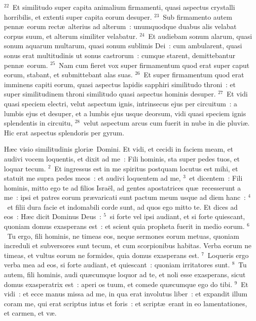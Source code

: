 ${}^{22}$~Et similitudo super capita animalium firmamenti, quasi aspectus crystalli horribilis, et extenti super capita eorum desuper.
${}^{23}$~Sub firmamento autem penn\ae\ eorum rect\ae\ alterius ad alterum~: unumquodque duabus alis velabat corpus suum, et alterum similiter velabatur.
${}^{24}$~Et audiebam sonum alarum, quasi sonum aquarum multarum, quasi sonum sublimis Dei~: cum ambularent, quasi sonus erat multitudinis ut sonus castrorum~: cumque starent, demittebantur penn\ae\ eorum.
${}^{25}$~Nam cum fieret vox super firmamentum quod erat super caput eorum, stabant, et submittebant alas suas.
${}^{26}$~Et super firmamentum quod erat imminens capiti eorum, quasi aspectus lapidis sapphiri similitudo throni~: et super similitudinem throni similitudo quasi aspectus hominis desuper.
${}^{27}$~Et vidi quasi speciem electri, velut aspectum ignis, intrinsecus ejus per circuitum~: a lumbis ejus et desuper, et a lumbis ejus usque deorsum, vidi quasi speciem ignis splendentis in circuitu,
${}^{28}$~velut aspectum arcus cum fuerit in nube in die pluvi\ae . Hic erat aspectus splendoris per gyrum.

\lettrine[lines=10,image=true,loversize=0.05,lraise=-0.03]{H}{}\ae c visio similitudinis glori\ae\ Domini. Et vidi, et cecidi in faciem meam, et audivi vocem loquentis, et dixit ad me~: Fili hominis, sta super pedes tuos, et loquar tecum.
${}^{2}$~Et ingressus est in me spiritus postquam locutus est mihi, et statuit me supra pedes meos~: et audivi loquentem ad me,
${}^{3}$~et dicentem~: Fili hominis, mitto ego te ad filios Isra\"el, ad gentes apostatrices qu\ae\ recesserunt a me~: ipsi et patres eorum pr\ae varicati sunt pactum meum usque ad diem hanc~:
${}^{4}$~et filii dura facie et indomabili corde sunt, ad quos ego mitto te. Et dices ad eos~: H\ae c dicit Dominus Deus~:
${}^{5}$~si forte vel ipsi audiant, et si forte quiescant, quoniam domus exasperans est~: et scient quia propheta fuerit in medio eorum.
${}^{6}$~Tu ergo, fili hominis, ne timeas eos, neque sermones eorum metuas, quoniam increduli et subversores sunt tecum, et cum scorpionibus habitas. Verba eorum ne timeas, et vultus eorum ne formides, quia domus exasperans est.
${}^{7}$~Loqueris ergo verba mea ad eos, si forte audiant, et quiescant~: quoniam irritatores sunt.
${}^{8}$~Tu autem, fili hominis, audi qu\ae cumque loquor ad te, et noli esse exasperans, sicut domus exasperatrix est~: aperi os tuum, et comede qu\ae cumque ego do tibi.
${}^{9}$~Et vidi~: et ecce manus missa ad me, in qua erat involutus liber~: et expandit illum coram me, qui erat scriptus intus et foris~: et script\ae\ erant in eo lamentationes, et carmen, et v\ae .

